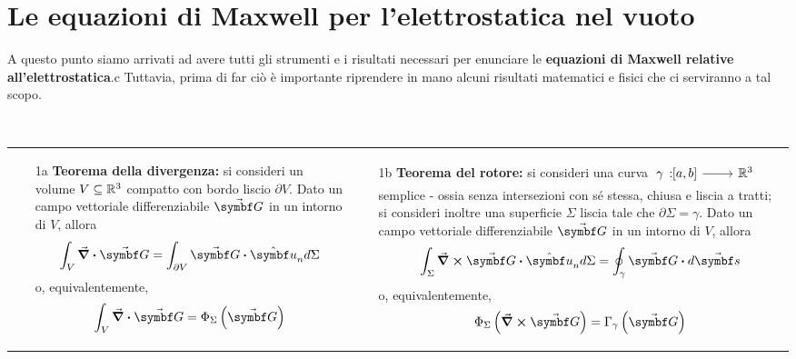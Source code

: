 \section{Le equazioni di Maxwell per l'elettrostatica nel vuoto}
A questo punto siamo arrivati ad avere tutti gli strumenti e i risultati necessari per enunciare le \textbf{equazioni di Maxwell relative all'elettrostatica}.c Tuttavia, prima di far ciò è importante riprendere in mano alcuni risultati matematici e fisici che ci serviranno a tal scopo.
\begin{remember}~\\
		\begin{tabular}{p{}p{}}
			\begin{itemize}
				\item[1a] \textbf{Teorema della divergenza:} si consideri un volume $V\subseteq\mathbb{R}^3$ compatto con bordo liscio $\partial V$. Dato un campo vettoriale differenziabile $\vba{G}$ in un intorno di $V$, allora
				\begin{equation*}
					\int_V\div{\vba{G}}=\int_{\partial V}\vba{G}\vdot \vbh{u}_nd\Sigma
				\end{equation*}
				o, equivalentemente,
				\begin{equation*}
					\int_V\div{\vba{G}}=\Phi_\Sigma\left(\vba{G}\right)
				\end{equation*}
			\end{itemize} &
			\begin{itemize}
			\item[1b] \textbf{Teorema del rotore:} si consideri una curva $\ \funz[\gamma]{\left[a,b\right]}{\realset^3}$ semplice - ossia senza intersezioni con sé stessa, chiusa e liscia a tratti; si consideri inoltre una superficie $\Sigma$ liscia tale che $\partial \Sigma=\gamma$. Dato un campo vettoriale differenziabile $\vba{G}$ in un intorno di $V$, allora
			\begin{equation*}
				\int_\Sigma\curl{\vba{G}}\vdot\vbh{u}_nd\Sigma=\oint_{\gamma}\vba{G}\vdot d\vba{s}
			\end{equation*}
			o, equivalentemente,
			\begin{equation*}
				\Phi_\Sigma\left(\curl{\vba{G}}\right)=\Gamma_\gamma\left(\vba{G}\right)
			\end{equation*}
		\end{itemize}\end{tabular}\\
		\begin{tabular}{p{}p{}}

\end{tabular}
\end{remember}
